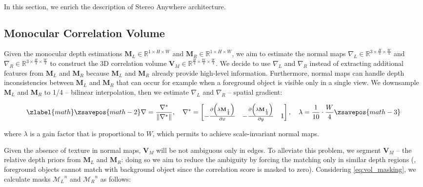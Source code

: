 \documentclass[10pt,twocolumn,letterpaper]{article}
\newcommand{\method}[0]{Stereo Anywhere\xspace}
\begin{document}
In this section, we enrich the description of \method architecture.


\phantom{Invisible Text}
\vspace{-\baselineskip}

\subsection{Monocular Correlation Volume}

\label{subsec:mono_corr}

Given the monocular depth estimations $\textbf{M}_L \in \mathbb{R}^{1 \times H \times W}$ and $\textbf{M}_R \in \mathbb{R}^{1 \times H \times W}$, we aim to estimate the normal maps $\nabla_L \in \mathbb{R}^{3 \times \frac{H}{4} \times \frac{W}{4}}$ and $\nabla_R \in \mathbb{R}^{3 \times \frac{H}{4} \times \frac{W}{4}}$ to construct the 3D correlation volume $\mathbf{V}_M \in \mathbb{R}^{\frac{H}{4} \times \frac{W}{4} \times \frac{W}{4}}$.
We decide to use $\nabla_L$ and $\nabla_R$ instead of extracting additional features from $\textbf{M}_L$ and $\textbf{M}_R$ because $\textbf{M}_L$ and $\textbf{M}_R$ already provide high-level information.
Furthermore, normal maps can handle depth inconsistencies between $\textbf{M}_L$ and $\textbf{M}_R$ that can occur for example when a foreground object is visible only in a single view.
We downsample $\textbf{M}_L$ and $\textbf{M}_R$ to 1/4  -- bilinear interpolation, then we estimate $\nabla_L$ and $\nabla_R$  -- spatial gradient:

\small

\begin{equation}
\zlabel{math}
    \zsavepos{math-2}
    \nabla = \frac{\nabla^*}{\lVert \nabla^* \rVert}, \quad \nabla^* = \begin{bmatrix}
        -\frac{\partial \left(\lambda\mathbf{M}_\frac{1}{4}\right)}{\partial x} & -\frac{\partial \left(\lambda\mathbf{M}_\frac{1}{4}\right)}{\partial y} & 1 \\
    \end{bmatrix}, \quad \lambda = \frac{1}{10}\cdot\frac{W}{4}
    \label{eq:normal_estimation}
    \zsavepos{math-3}\end{equation}

\normalsize
where $\lambda$ is a gain factor that is proportional to $W$, which permits to achieve scale-invariant normal maps.

Given the absence of texture in normal maps, $\textbf{V}_M$ will be not ambiguous only in edges.
To alleviate this problem, we segment $\textbf{V}_M$  -- the relative depth priors from $\textbf{M}_L$ and $\textbf{M}_R$: doing so we aim to reduce the ambiguity by forcing the matching only in similar depth regions (\eg, foreground objects cannot match with background object since the correlation score is masked to zero).
Considering \cref{eq:vol_masking}, we calculate masks ${\mathcal{M}_L}^n$ and ${\mathcal{M}_R}^n$ as follows:
\end{document}
